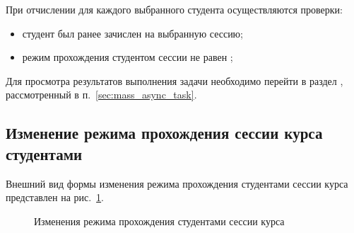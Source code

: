 При отчислении для каждого выбранного студента осуществляются проверки:
\begin{itemize}
	\item студент был ранее зачислен на выбранную сессию;
	\item режим прохождения студентом сессии не равен ;
\end{itemize}

Для просмотра результатов выполнения задачи необходимо перейти в раздел , 
рассмотренный в п.~\ref{sec:mass_async_task}.

\subsection{Изменение режима прохождения сессии курса студентами}
Внешний вид формы изменения режима прохождения студентами сессии курса представлен на рис.~\ref{img:student:change_mode}.


\begin{figure}[H]
	\caption{Изменения режима прохождения студентами сессии курса}
	\label{img:student:change_mode}
\end{figure}

